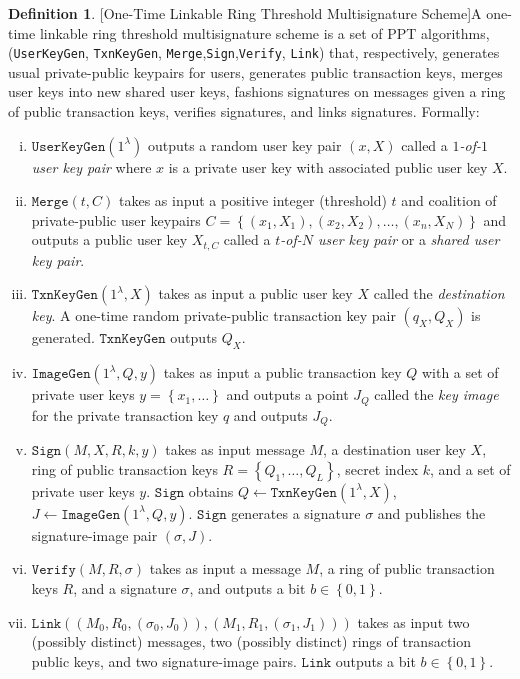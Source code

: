 \documentclass{mrl}
\theoremstyle{definition}
\newtheorem{defn}[theorem]{Definition}
\begin{document}
\begin{defn}{[One-Time Linkable Ring Threshold Multisignature Scheme]}\label{OT-LRTM} A one-time linkable ring threshold multisignature scheme is a set of PPT algorithms, (\texttt{UserKeyGen}, \texttt{TxnKeyGen}, \texttt{Merge},\texttt{Sign},\texttt{Verify}, \texttt{Link}) that, respectively, generates usual private-public keypairs for users, generates public transaction keys, merges user keys into new shared user keys, fashions signatures on messages given a ring of public transaction keys, verifies signatures, and links signatures. Formally:
\begin{enumerate}[(i)]
    \item $\texttt{UserKeyGen}(1^\lambda)$ outputs a random user key pair $(x,X)$ called a \textit{$1$-of-$1$ user key pair} where $x$ is a private user key with associated public user key $X$.
    
    \item $\texttt{Merge}(t,C)$ takes as input a positive integer (threshold) $t$ and coalition of private-public user keypairs $C=\left\{(x_1,X_1), (x_2,X_2), \ldots, (x_n,X_N)\right\}$ and outputs a public user key $X_{t,C}$ called a \textit{$t$-of-$N$ user key pair} or a \textit{shared user key pair}.
    
    \item $\texttt{TxnKeyGen}(1^\lambda, X)$ takes as input a public user key $X$ called the \textit{destination key}. A one-time random private-public transaction key pair $(q_X,Q_X)$ is generated. $\texttt{TxnKeyGen}$ outputs $Q_X$.
    
    \item $\texttt{ImageGen}(1^\lambda, Q, y)$ takes as input a public transaction key $Q$ with a set of private user keys $y = \left\{x_1, \ldots\right\}$ and outputs a point $J_Q$ called the \textit{key image} for the private transaction key $q$ and outputs $J_Q$.
    
    \item $\texttt{Sign}(M,X,R,k, y)$ takes as input message $M$, a destination user key $X$, ring of public transaction keys $R=\left\{Q_1, \ldots, Q_L\right\}$, secret index $k$, and a set of private user keys $y$.  $\texttt{Sign}$ obtains $Q \leftarrow \texttt{TxnKeyGen}(1^\lambda, X)$, $J \leftarrow \texttt{ImageGen}(1^\lambda, Q, y)$.  $\texttt{Sign}$ generates a signature $\sigma$ and publishes the signature-image pair $(\sigma, J)$.
    
    \item $\texttt{Verify}(M,R,\sigma)$ takes as input a message $M$, a ring of public transaction keys $R$, and a signature $\sigma$, and outputs a bit $b \in \left\{0,1\right\}$. 
    
    \item $\texttt{Link}((M_0,R_0,(\sigma_0, J_0)), (M_1,R_1,(\sigma_1, J_1)))$ takes as input two (possibly distinct) messages, two (possibly distinct) rings of transaction public keys, and two signature-image pairs. $\texttt{Link}$ outputs a bit $b \in \left\{0,1\right\}$.
\end{enumerate}
\end{defn}
\end{document}
